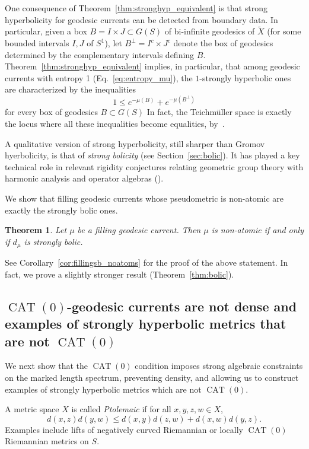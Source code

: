\documentclass[12pt]{amsart}
\numberwithin{equation}{section}
\numberwithin{figure}{section}
\newtheorem{mainthm}{Theorem}
\theoremstyle{definition}
\theoremstyle{plain}
\DeclareMathOperator{\CAT}{CAT}
\newcommand*{\wt}[1]{\widetilde{#1}}
\begin{document}
One consequence of Theorem~\ref{thm:stronghyp_equivalent} is that strong hyperbolicity for geodesic currents can be detected from boundary data. In particular, given a box $B= I \times J \subset G(S)$ of bi-infinite geodesics of $\wt{X}$ (for some bounded intervals $I, J$ of $S^1$), let $B^\perp = I^c \times J^c$ denote the box of geodesics determined by the complementary intervals defining $B$.
Theorem~\ref{thm:stronghyp_equivalent} implies, in particular, that among geodesic currents with entropy 1 (Eq.~\eqref{eq:entropy_mu}), the $1$-strongly hyperbolic ones are characterized by the inequalities
\[
1 \leq e^{-\mu(B)}+e^{-\mu(B^\perp)}
\]
for every box of geodesics $B \subset G(S)$
In fact, the Teichm\"uller space is exactly the locus where all these inequalities become equalities, by~\cite[Theorem~13]{Bonahon88:GeodesicCurrent}.

A qualitative version of strong hyperbolicity, still sharper than Gromov hyerbolicity, is that of \emph{strong bolicity} (see Section~\ref{sec:bolic}). It has played a key technical role in relevant rigidity conjectures relating geometric group theory with harmonic analysis and operator algebras (\cite{MineyevYu2002BaumConnes}).

We show that filling geodesic currents whose pseudometric is non-atomic are exactly the strongly bolic ones.
\begin{mainthm}
Let $\mu$ be a filling geodesic current.
Then $\mu$ is non-atomic if and only if $d_\mu$ is strongly bolic.
\label{mainthm:bolic}
\end{mainthm}
See Corollary~\ref{cor:fillingsb_noatoms} for the proof of the above statement. In fact, we prove a slightly stronger result (Theorem~\ref{thm:bolic}).

\subsection{$\CAT(0)$-geodesic currents are not dense and examples of strongly hyperbolic metrics that are not $\CAT(0)$}

We next show that the $\CAT(0)$ condition imposes strong algebraic constraints on the marked length spectrum, preventing density, and allowing us to construct examples of strongly hyperbolic metrics which are not $\CAT(0)$.

A metric space $X$ is called \emph{Ptolemaic} if for all $x,y,z,w \in X$,
\[
d(x,z)d(y,w) \leq d(x,y)d(z,w) + d(x,w)d(y,z).
\]
Examples include lifts of negatively curved Riemannian or locally $\CAT(0)$ Riemannian metrics on $S$.
\end{document}
